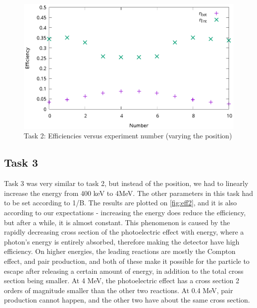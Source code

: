 \documentclass[a4paper,12pt]{article}
\begin{document}
\begin{figure}[h!]
\centering
\includegraphics[width=\textwidth]{./2.eps}
\caption{Task 2: Efficiencies versus experiment number (varying the position)}
\label{fig:eff1}
\end{figure}


\subsection{Task 3}
Task 3 was very similar to task 2, but instead of the position, we had to linearly increase the energy from 400 keV to 4MeV. The other parameters in this task had to be set according to 1/B. The results are plotted on \autoref{fig:eff2}, and it is also according to our expectations - increasing the energy does reduce the efficiency, but after a while, it is almost constant. This phenomenon is caused by the rapidly decreasing cross section of the photoelectric effect with energy, where a photon's energy is entirely absorbed, therefore making the detector have high efficiency. On higher energies, the leading reactions are mostly the Compton effect, and pair production, and both of these make it possible for the particle to escape after releasing a certain amount of energy, in addition to the total cross section being smaller. At 4 MeV, the photoelectric effect has a cross section 2 orders of magnitude smaller than the other two reactions. At 0.4 MeV, pair production cannot happen, and the other two have about the same cross section.
\end{document}

